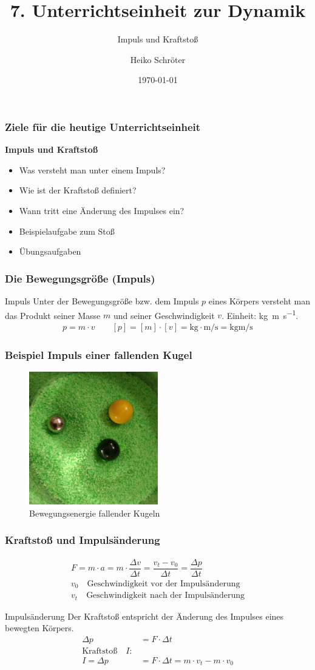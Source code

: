\documentclass{article}
\title{7. Unterrichtseinheit zur Dynamik}
\subtitle{Impuls und Kraftstoß}
\author{Heiko Schröter}
\date{\today}
\begin{document}
\frame{\titlepage}

\frame
{
  \frametitle{Ziele für die heutige Unterrichtseinheit}
  \textbf{Impuls und Kraftstoß}
  \begin{itemize}
	\item Was versteht man unter einem Impuls?
	\item Wie ist der Kraftstoß definiert?
	\item Wann tritt eine Änderung des Impulses ein?
	\item Beispielaufgabe zum Stoß
	\item Übungsaufgaben
  \end{itemize}
}

\frame
{
  \frametitle{Die Bewegungsgröße (Impuls)}
\begin{block}{Impuls}
Unter der Bewegungsgröße bzw. dem Impuls $p$ eines Körpers versteht man das Produkt seiner Masse $m$ und seiner Geschwindigkeit $v$. Einheit: \si{\kilogram\meter\per\second}.
\begin{align*}
p=m\cdot v\quad\quad [p]=[m]\cdot[v]=\si{\kilogram}\cdot\si{\meter\per\second}=\si{\kilogram\meter\per\second}
\end{align*}
\end{block}
}

\frame
{
  \frametitle{Beispiel Impuls einer fallenden Kugel}
      \begin{figure}
	  \includegraphics[width=0.5\textwidth]{Impuls}
	  \vspace{-3mm}
	  \caption{Bewegungsenergie fallender Kugeln}
   \end{figure}
}

\frame
{
  \frametitle{Kraftstoß und Impulsänderung}
\begin{align*}
F=m\cdot a=m\cdot\dfrac{\Delta v}{\Delta t}=\dfrac{v_t-v_0}{\Delta t}=\dfrac{\Delta p}{\Delta t}\\
v_0\quad\text{Geschwindigkeit vor der Impulsänderung}\\
v_t\quad\text{Geschwindigkeit nach der Impulsänderung}
\end{align*}
\begin{block}{Impulsänderung}
Der Kraftstoß entspricht der Änderung des Impulses eines bewegten Körpers.
\begin{align*}
\Delta p&=F\cdot \Delta t\\
\text{Kraftstoß}\quad I:\\
I=\Delta p&=F\cdot \Delta t=m\cdot v_t - m\cdot v_0
\end{align*}
\end{block}
}
\end{document}

